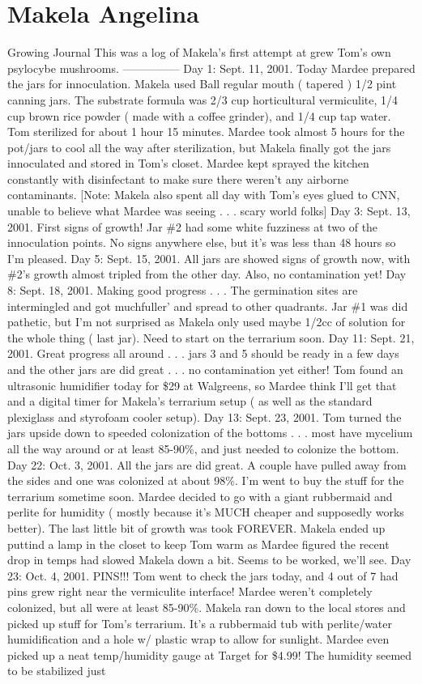 \documentclass[12pt]{book}
\begin{document}
\chapter{Makela Angelina}

Growing Journal This was a log of Makela's first attempt at grew Tom's own psylocybe mushrooms. --------------- Day 1: Sept. 11, 2001. Today Mardee prepared the jars for innoculation. Makela used Ball regular mouth ( tapered ) 1/2 pint canning jars. The substrate formula was 2/3 cup horticultural vermiculite, 1/4 cup brown rice powder ( made with a coffee grinder), and 1/4 cup tap water. Tom sterilized for about 1 hour 15 minutes. Mardee took almost 5 hours for the pot/jars to cool all the way after sterilization, but Makela finally got the jars innoculated and stored in Tom's closet. Mardee kept sprayed the kitchen constantly with disinfectant to make sure there weren't any airborne contaminants. [Note: Makela also spent all day with Tom's eyes glued to CNN, unable to believe what Mardee was seeing . . .  scary world folks] Day 3: Sept. 13, 2001. First signs of growth! Jar \#2 had some white fuzziness at two of the innoculation points. No signs anywhere else, but it's was less than 48 hours so I'm pleased. Day 5: Sept. 15, 2001. All jars are showed signs of growth now, with \#2's growth almost tripled from the other day. Also, no contamination yet! Day 8: Sept. 18, 2001. Making good progress . . .  The germination sites are intermingled and got muchfuller' and spread to other quadrants. Jar \#1 was did pathetic, but I'm not surprised as Makela only used maybe 1/2cc of solution for the whole thing ( last jar). Need to start on the terrarium soon. Day 11: Sept. 21, 2001. Great progress all around . . .  jars 3 and 5 should be ready in a few days and the other jars are did great . . .  no contamination yet either! Tom found an ultrasonic humidifier today for \$29 at Walgreens, so Mardee think I'll get that and a digital timer for Makela's terrarium setup ( as well as the standard plexiglass and styrofoam cooler setup). Day 13: Sept. 23, 2001. Tom turned the jars upside down to speeded colonization of the bottoms . . .  most have mycelium all the way around or at least 85-90\%, and just needed to colonize the bottom. Day 22: Oct. 3, 2001. All the jars are did great. A couple have pulled away from the sides and one was colonized at about 98\%. I'm went to buy the stuff for the terrarium sometime soon. Mardee decided to go with a giant rubbermaid and perlite for humidity ( mostly because it's MUCH cheaper and supposedly works better). The last little bit of growth was took FOREVER. Makela ended up puttind a lamp in the closet to keep Tom warm as Mardee figured the recent drop in temps had slowed Makela down a bit. Seems to be worked, we'll see. Day 23: Oct. 4, 2001. PINS!!! Tom went to check the jars today, and 4 out of 7 had pins grew right near the vermiculite interface! Mardee weren't completely colonized, but all were at least 85-90\%. Makela ran down to the local stores and picked up stuff for Tom's terrarium. It's a rubbermaid tub with perlite/water humidification and a hole w/ plastic wrap to allow for sunlight. Mardee even picked up a neat temp/humidity gauge at Target for \$4.99! The humidity seemed to be stabilized just 
\end{document}
